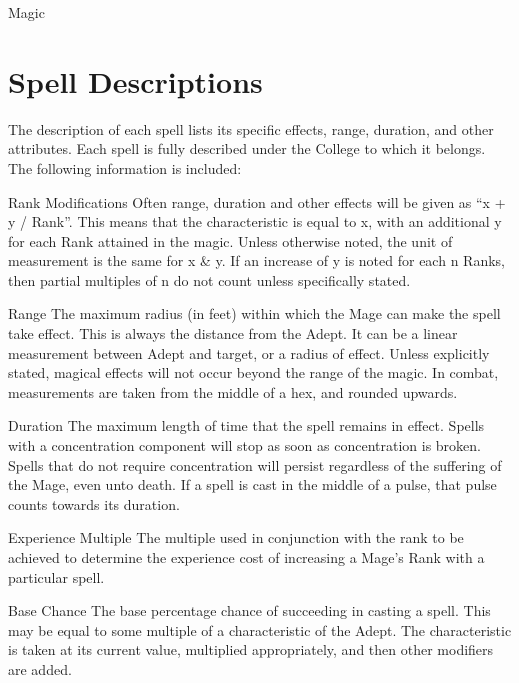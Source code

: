 \begin{Chapter}{Magic}
\section{Spell Descriptions}

The description of each spell lists its specific effects, range,
duration, and other attributes.  Each spell is fully described under
the College to which it belongs. The following information is
included:

\begin{Description}

\item[Rank Modifications] Often range, duration and other effects will
  be given as “x + y / Rank”. This means that the characteristic is
  equal to x, with an additional y for each Rank attained in the
  magic.  Unless otherwise noted, the unit of measurement is the same
  for x \& y. If an increase of y is noted for each n Ranks, then
  partial multiples of n do not count unless specifically stated.

\item[Range] The maximum radius (in feet) within which the Mage can
  make the spell take effect.  This is always the distance from the
  Adept.  It can be a linear measurement between Adept and target, or
  a radius of effect.  Unless explicitly stated, magical effects will
  not occur beyond the range of the magic.  In combat, measurements
  are taken from the middle of a hex, and rounded upwards.

\item[Duration] The maximum length of time that the spell remains in
  effect. Spells with a concentration component will stop as soon as
  concentration is broken.  Spells that do not require concentration
  will persist regardless of the suffering of the Mage, even unto
  death. If a spell is cast in the middle of a pulse, that pulse
  counts towards its duration.

\item[Experience Multiple] The multiple used in conjunction with the
  rank to be achieved to determine the experience cost of increasing a
  Mage’s Rank with a particular spell.

\item[Base Chance] The base percentage chance of succeeding in casting
  a spell.  This may be equal to some multiple of a characteristic of
  the Adept. The characteristic is taken at its current value,
  multiplied appropriately, and then other modifiers are added.


\end{Description}
\end{Chapter}
